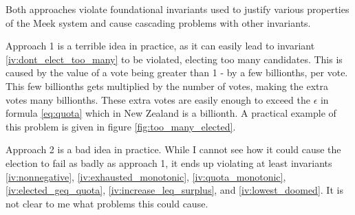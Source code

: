 \documentclass{article}
\begin{document}
Both approaches violate foundational invariants used to justify various properties
of the Meek system and cause cascading problems with other invariants.

Approach 1 is a terrible idea in practice, as it can easily lead to invariant
\ref{iv:dont_elect_too_many} to be violated, electing too many candidates.
This is caused by the value of a vote being greater than 1 - by a few billionths,
per vote. This few billionths gets multiplied by the number of votes,
making the extra votes many billionths. These extra votes are easily enough to 
exceed the $\epsilon$ in formula \ref{eq:quota} which in New Zealand is a billionth.
A practical example of this problem is given in figure \ref{fig:too_many_elected}.

Approach 2 is a bad idea in practice. While I cannot see how it could cause the
election to fail as badly as approach 1, it ends up violating at least invariants \ref{iv:nonnegative},
\ref{iv:exhausted_monotonic}, \ref{iv:quota_monotonic}, \ref{iv:elected_geq_quota},
\ref{iv:increase_leq_surplus}, and \ref{iv:lowest_doomed}. It is not clear
to me what problems this could cause.
\end{document}
